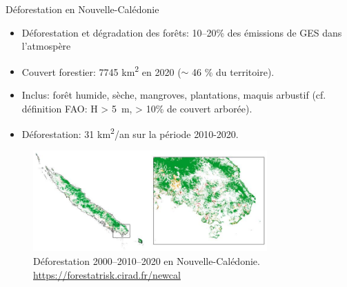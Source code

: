 \documentclass[10pt,table,dvipsnames,compress]{beamer}
\begin{document}
\begin{frame}[label={sec:orgd5b5b80}]{Déforestation en Nouvelle-Calédonie}
\begin{itemize}
\item Déforestation et dégradation des forêts: 10--20\% des émissions de GES dans l'atmospère
\item Couvert forestier: 7745 km\textsuperscript{2} en 2020 (\(\sim\) 46 \% du territoire).
\item Inclus: forêt humide, sèche, mangroves, plantations, maquis arbustif (cf. définition FAO: H > 5 m, > 10\% de couvert arborée).
\item Déforestation: 31 km\textsuperscript{2}/an sur la période 2010-2020.
\end{itemize}

\begin{figure}[htbp]
\centering
\includegraphics[width=0.8\textwidth]{figs/deforestation-NC.jpg}
\caption{Déforestation 2000--2010--2020 en Nouvelle-Calédonie. \url{https://forestatrisk.cirad.fr/newcal}}
\end{figure}
\end{frame}
\end{document}
